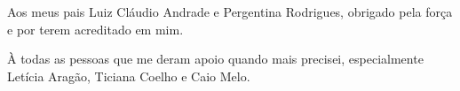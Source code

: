 \begin{dedicatoria}
   \vspace*{\fill}
   	\begin{flushright}
   \noindent
    Aos meus pais Luiz Cláudio Andrade e Pergentina Rodrigues, obrigado pela força e por terem acreditado em mim.
    
    À todas as pessoas que me deram apoio quando mais precisei, especialmente Letícia Aragão, Ticiana Coelho e Caio Melo.
   	\end{flushright}
\end{dedicatoria}
